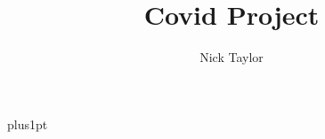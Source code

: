 \documentclass[12pt]{ociamthesis}
\title{Covid Project}
\author{Nick Taylor}             %
\begin{document}
\baselineskip=18pt plus1pt

\setcounter{secnumdepth}{3}
\setcounter{tocdepth}{3}


\maketitle                  %
\begin{romanpages}          %
\tableofcontents            %
\end{romanpages}            %







\renewcommand{\bibname}{References}

\appendix
\renewcommand\chaptermark[1]{\markboth{\sffamily\normalsize\bfseries \appendixname~\thechapter.}{}}

\end{document}
